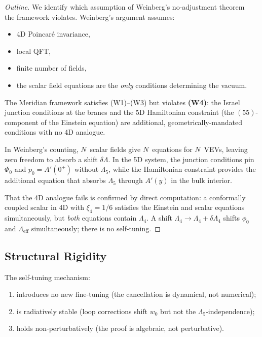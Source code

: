 \begin{proof}[Outline]
We identify which assumption of Weinberg's no-adjustment theorem~\cite{ch3:weinberg1989} the framework violates. Weinberg's argument assumes:
\begin{itemize}
  \item[(W1)] 4D Poincar\'e invariance,
  \item[(W2)] local QFT,
  \item[(W3)] finite number of fields,
  \item[(W4)] the scalar field equations are the \emph{only} conditions determining the vacuum.
\end{itemize}

The Meridian framework satisfies (W1)--(W3) but violates \textbf{(W4)}: the Israel junction conditions at the branes and the 5D Hamiltonian constraint (the $(55)$-component of the Einstein equation) are additional, geometrically-mandated conditions with no 4D analogue.

In Weinberg's counting, $N$~scalar fields give $N$~equations for $N$~VEVs, leaving zero freedom to absorb a shift $\delta\Lambda$. In the 5D system, the junction conditions pin $\Phi_0$ and $p_0 = A'(0^+)$ without $\Lambda_5$, while the Hamiltonian constraint provides the additional equation that absorbs $\Lambda_5$ through $A'(y)$ in the bulk interior.

That the 4D analogue fails is confirmed by direct computation: a conformally coupled scalar in 4D with $\xi_4 = 1/6$ satisfies the Einstein and scalar equations simultaneously, but \emph{both} equations contain $\Lambda_4$. A shift $\Lambda_4 \to \Lambda_4 + \delta\Lambda_4$ shifts $\phi_0$ and $\Lambda_{\mathrm{eff}}$ simultaneously; there is no self-tuning.
\end{proof}

\subsection{Structural Rigidity}
\label{sec:3-vnogo-rigid}

\begin{proposition}
\label{thm:vnogo-rigid}
The self-tuning mechanism:
\begin{enumerate}
  \item[\emph{(a)}] introduces no new fine-tuning (the cancellation is dynamical, not numerical);
  \item[\emph{(b)}] is radiatively stable (loop corrections shift $w_0$ but not the $\Lambda_5$-independence);
  \item[\emph{(c)}] holds non-perturbatively (the proof is algebraic, not perturbative).
\end{enumerate}
\end{proposition}

